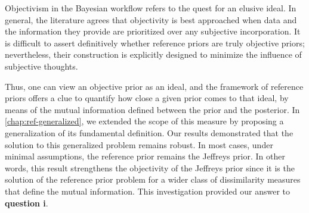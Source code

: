 










Objectivism in the Bayesian workflow refers to the quest for an elusive ideal. %
In general, the literature agrees that objectivity is best approached when data and the information they provide are prioritized over any subjective incorporation. It is difficult to assert definitively whether reference priors are truly objective priors; nevertheless, their construction is explicitly designed to minimize the influence of subjective thoughts.

Thus, one can view an objective prior as an ideal, and the framework of reference priors offers
a clue to quantify how close a given prior comes to that ideal, by means of the mutual information defined between the prior and the posterior.
In \cref{chap:ref-generalized}, we extended the scope of this measure by proposing a generalization of its fundamental definition. %
Our results demonstrated that the solution to this generalized problem remains robust. In most cases, under minimal assumptions, the reference prior remains the Jeffreys prior. 
In other words, this result strengthens the objectivity of  the Jeffreys prior since it is the solution of the reference prior problem for a wider class of dissimilarity measures that define the mutual information. %
This investigation provided our answer to \textbf{question i}.

